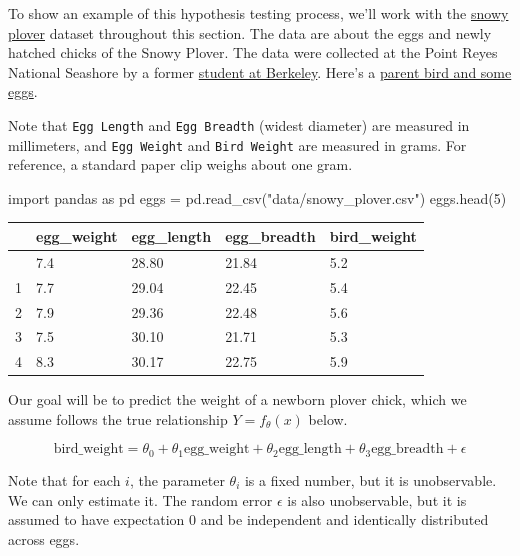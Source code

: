 \documentclass[
  letterpaper,
  DIV=11,
  numbers=noendperiod]{scrreprt}
\newenvironment{Shaded}{\begin{snugshade}}{\end{snugshade}}
\newcommand{\DecValTok}[1]{\textcolor[rgb]{0.68,0.00,0.00}{#1}}
\newcommand{\ImportTok}[1]{\textcolor[rgb]{0.00,0.46,0.62}{#1}}
\newcommand{\NormalTok}[1]{\textcolor[rgb]{0.00,0.23,0.31}{#1}}
\newcommand{\OperatorTok}[1]{\textcolor[rgb]{0.37,0.37,0.37}{#1}}
\newcommand{\StringTok}[1]{\textcolor[rgb]{0.13,0.47,0.30}{#1}}
\begin{document}
To show an example of this hypothesis testing process, we'll work with
the \href{https://www.audubon.org/field-guide/bird/snowy-plover}{snowy
plover} dataset throughout this section. The data are about the eggs and
newly hatched chicks of the Snowy Plover. The data were collected at the
Point Reyes National Seashore by a former
\href{https://openlibrary.org/books/OL2038693M/BLSS_the_Berkeley_interactive_statistical_system}{student
at Berkeley}. Here's a
\href{http://cescos.fau.edu/jay/eps/articles/snowyplover.html}{parent
bird and some eggs}.

Note that \texttt{Egg\ Length} and \texttt{Egg\ Breadth} (widest
diameter) are measured in millimeters, and \texttt{Egg\ Weight} and
\texttt{Bird\ Weight} are measured in grams. For reference, a standard
paper clip weighs about one gram.

\begin{Shaded}
\begin{Highlighting}[]
\ImportTok{import}\NormalTok{ pandas }\ImportTok{as}\NormalTok{ pd}
\NormalTok{eggs }\OperatorTok{=}\NormalTok{ pd.read\_csv(}\StringTok{"data/snowy\_plover.csv"}\NormalTok{)}
\NormalTok{eggs.head(}\DecValTok{5}\NormalTok{)}
\end{Highlighting}
\end{Shaded}

\begin{longtable}[]{@{}lllll@{}}
\toprule\noalign{}
& egg\_weight & egg\_length & egg\_breadth & bird\_weight \\
\midrule\noalign{}
\endhead
\bottomrule\noalign{}
\endlastfoot
0 & 7.4 & 28.80 & 21.84 & 5.2 \\
1 & 7.7 & 29.04 & 22.45 & 5.4 \\
2 & 7.9 & 29.36 & 22.48 & 5.6 \\
3 & 7.5 & 30.10 & 21.71 & 5.3 \\
4 & 8.3 & 30.17 & 22.75 & 5.9 \\
\end{longtable}

Our goal will be to predict the weight of a newborn plover chick, which
we assume follows the true relationship \(Y = f_{\theta}(x)\) below.

\[\text{bird\_weight} = \theta_0 + \theta_1 \text{egg\_weight} + \theta_2 \text{egg\_length} + \theta_3 \text{egg\_breadth} + \epsilon\]

Note that for each \(i\), the parameter \(\theta_i\) is a fixed number,
but it is unobservable. We can only estimate it. The random error
\(\epsilon\) is also unobservable, but it is assumed to have expectation
0 and be independent and identically distributed across eggs.
\end{document}
